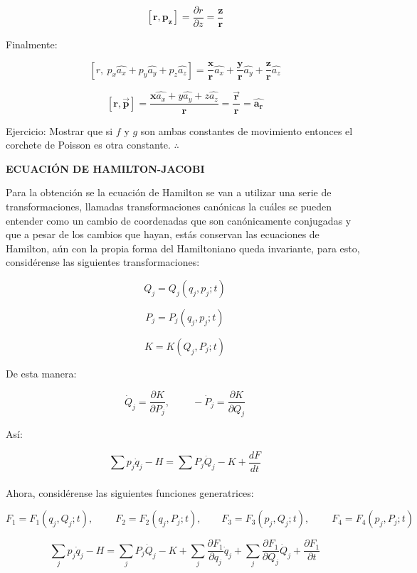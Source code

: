 \documentclass[]{article}
\begin{document}
\[\left\lbrack \mathbf{r,}\mathbf{p}_{\mathbf{z}} \right\rbrack\mathbf{=}\frac{\partial r}{\partial z} = \frac{\mathbf{z}}{\mathbf{r}}\]

Finalmente:

\[\left\lbrack r,\ p_{x}\widehat{a_{x}} + p_{y}\widehat{a_{y}} + p_{z}\widehat{a_{z}} \right\rbrack = \frac{\mathbf{x}}{\mathbf{r}}\widehat{a_{x}} + \frac{\mathbf{y}}{\mathbf{r}}\widehat{a_{y}} + \frac{\mathbf{z}}{\mathbf{r}}\widehat{a_{z}}\]

\[\left\lbrack \mathbf{r,}\overrightarrow{\mathbf{p}} \right\rbrack\mathbf{=}\frac{\mathbf{x}\widehat{a_{x}} + y\widehat{a_{y}} + z\widehat{a_{z}}}{\mathbf{r}}\mathbf{=}\frac{\overrightarrow{\mathbf{r}}}{\mathbf{r}}\mathbf{=}\widehat{\mathbf{a}_{\mathbf{r}}}\]

Ejercicio: Mostrar que si \(f\) y \(g\) son ambas constantes de
movimiento entonces el corchete de Poisson es otra constante.
\(\therefore\)

\textbf{ECUACIÓN DE HAMILTON-JACOBI}

Para la obtención se la ecuación de Hamilton se van a utilizar una serie
de transformaciones, llamadas transformaciones canónicas la cuáles se
pueden entender como un cambio de coordenadas que son canónicamente
conjugadas y que a pesar de los cambios que hayan, estás conservan las
ecuaciones de Hamilton, aún con la propia forma del Hamiltoniano queda
invariante, para esto, considérense las siguientes transformaciones:

\[Q_{j} = Q_{j}\left( q_{j},p_{j};t \right)\]

\[P_{j} = P_{j}\left( q_{j},p_{j};t \right)\]

\[K = K\left( Q_{j},P_{j};t \right)\]

De esta manera:

\[{\dot{Q}}_{j} = \frac{\partial K}{\partial P_{j}},\ \ \ \ \ \ \ \ \ \  - {\dot{P}}_{j} = \frac{\partial K}{\partial Q_{j}}\]

Así:

\[\sum_{}^{}{p_{j}{\dot{q}}_{j}} - H = \sum_{}^{}{P_{j}{\dot{Q}}_{j}} - K + \frac{dF}{dt}\]

Ahora, considérense las siguientes funciones generatrices:

\[F_{1} = F_{1}\left( q_{j},Q_{j};t \right),\ \ \ \ \ \ \ \ \ \ F_{2} = F_{2}\left( q_{j},P_{j};t \right),\ \ \ \ \ \ \ \ \ F_{3} = F_{3}\left( p_{j},Q_{j};t \right),\ \ \ \ \ \ \ \ \ \ F_{4} = F_{4}\left( p_{j},P_{j};t \right)\]

\[\sum_{j}^{}{p_{j}{\dot{q}}_{j}} - H = \sum_{j}^{}{P_{j}{\dot{Q}}_{j}} - K + \sum_{j}^{}\frac{\partial F_{1}}{\partial q_{j}}{\dot{q}}_{j} + \sum_{j}^{}\frac{\partial F_{1}}{\partial Q_{j}}{\dot{Q}}_{j} + \frac{\partial F_{1}}{\partial t}\]
\end{document}
